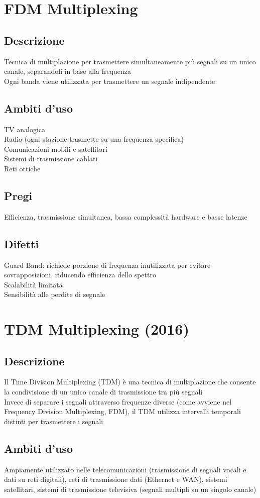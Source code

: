 \documentclass[10pt,oneside,a4paper]{article}
\begin{document}
\section{FDM Multiplexing}
\subsection{Descrizione}
Tecnica di multiplazione per trasmettere simultaneamente più segnali su un unico canale, separandoli in base alla frequenza\\
Ogni banda viene utilizzata per trasmettere un segnale indipendente
\subsection{Ambiti d'uso}
TV analogica\\
Radio (ogni stazione trasmette su una frequenza specifica)\\
Comunicazioni mobili e satellitari\\
Sistemi di trasmissione cablati\\
Reti ottiche
\subsection{Pregi}
Efficienza, trasmissione simultanea, bassa complessità hardware e basse latenze
\subsection{Difetti}
Guard Band: richiede porzione di frequenza inutilizzata per evitare sovrapposizioni, riducendo efficienza dello spettro\\
Scalabilità limitata\\
Sensibilità alle perdite di segnale
\section{TDM Multiplexing (2016)}
\subsection{Descrizione}
Il Time Division Multiplexing (TDM) è una tecnica di multiplazione che consente la condivisione di un unico canale di trasmissione tra più segnali\\
Invece di separare i segnali attraverso frequenze diverse (come avviene nel Frequency Division Multiplexing, FDM), il TDM utilizza intervalli temporali distinti per trasmettere i segnali
\subsection{Ambiti d'uso}
Ampiamente utilizzato nelle telecomunicazioni (trasmissione di segnali vocali e dati su reti digitali), reti di trasmissione dati (Ethernet e WAN), sistemi satellitari, sistemi di trasmissione televisiva (segnali multipli su un singolo canale)
\end{document}
